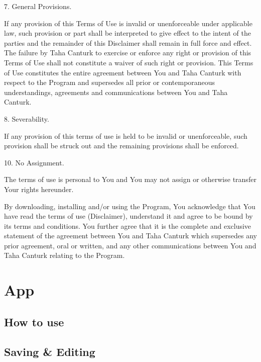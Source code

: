 \documentclass[a4paper,12pt]{article}
\begin{document}
7. General Provisions.

If any provision of this Terms of Use is invalid or unenforceable under applicable law, such provision or part shall be interpreted to give effect to the intent of the parties and the remainder of this Disclaimer shall remain in full force and effect. The failure by Taha Canturk to exercise or enforce any right or provision of this Terms of Use shall not constitute a waiver of such right or provision. This Terms of Use constitutes the entire agreement between You and Taha Canturk with respect to the Program and supersedes all prior or contemporaneous understandings, agreements and communications between You and Taha Canturk.

8. Severability.

If any provision of this terms of use is held to be invalid or unenforceable, such provision shall be struck out and the remaining provisions shall be enforced.

10. No Assignment.

The terms of use is personal to You and You may not assign or otherwise transfer Your rights hereunder.

By downloading, installing and/or using the Program, You acknowledge that You have read the terms of use (Disclaimer), understand it and agree to be bound by its terms and conditions. You further agree that it is the complete and exclusive statement of the agreement between You and Taha Canturk which supersedes any prior agreement, oral or written, and any other communications between You and Taha Canturk relating to the Program.

\newpage %

\begin{abstract}

\end{abstract}

\newpage

\tableofcontents

\large

\section{App}

\subsection{How to use}

\subsection{Saving \& Editing}
\end{document}
